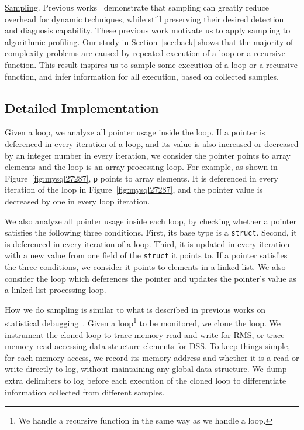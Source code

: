 \noindent\underline{Sampling}.
Previous works~\cite{liblit03,liblit05,CCI,SongOOPSLA2014,ldoctor}
demonstrate that sampling can greatly 
reduce overhead for dynamic techniques,
while still preserving their desired 
detection and diagnosis capability. 
These previous work motivate us to apply sampling to algorithmic profiling. 
Our study in Section~\ref{sec:back} shows that 
the majority of complexity problems are caused by repeated execution of a loop
or a recursive function. 
This result inspires us to sample some execution of 
a loop or a recursive function,
and infer information for all execution, 
based on collected samples.

\subsection{Detailed Implementation}

Given a loop, we analyze all pointer usage inside the loop. 
If a pointer is deferenced in every iteration of a loop, 
and its value is also increased or decreased by 
an integer number in every iteration,
we consider the pointer points to array elements and 
the loop is an array-processing loop.  
For example, as shown in Figure~\ref{fig:mysql27287}, 
\texttt{p} points to array elements. 
It is deferenced in every iteration of the loop 
in Figure~\ref{fig:mysql27287},
and the pointer value is decreased by one in every loop iteration. 

We also analyze all pointer usage inside each loop, 
by checking whether a pointer satisfies the following three conditions.
First, its base type is a \texttt{struct}.
Second, it is deferenced in every iteration of a loop.
Third, it is updated in every iteration with a new value 
from one field of the \texttt{struct} it points to.
If a pointer satisfies the three conditions, 
we consider it points to elements in a linked list.
We also consider the loop which deferences the pointer and 
updates the pointer's value as  
a linked-list-processing loop. 


How we do sampling is similar to what is described in previous works 
on statistical debugging~\cite{liblit03,liblit05,CCI,SongOOPSLA2014,ldoctor}.
Given a loop\footnote{We handle a recursive function 
in the same way as we handle a loop.} to be monitored, 
we clone the loop.
We instrument the cloned loop to trace memory read and write for RMS, 
or trace memory read accessing data structure elements for DSS.
To keep things simple, 
for each memory access, we record its memory address 
and whether it is a read or write directly to log, 
without maintaining any global data structure. 
We dump extra delimiters to log before each execution of the cloned loop 
to differentiate information collected 
from different samples.

